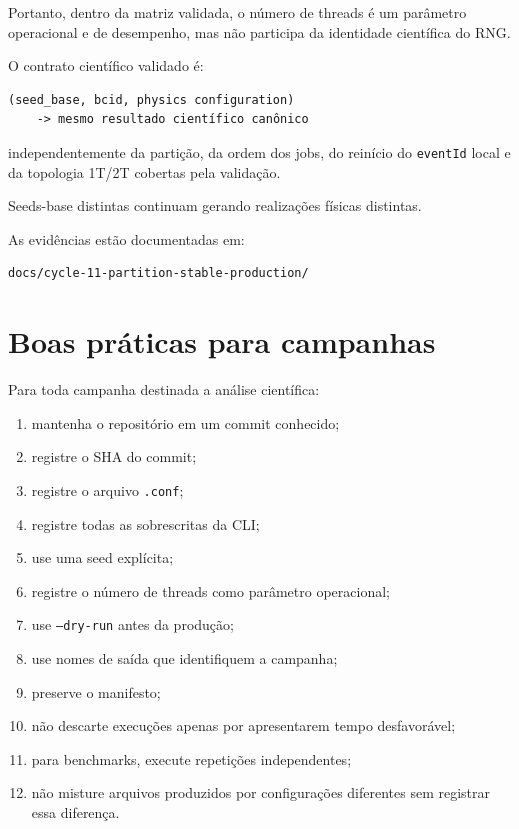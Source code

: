 \documentclass[11pt,a4paper]{article}
\begin{document}
Portanto, dentro da matriz validada, o número de threads é um parâmetro
operacional e de desempenho, mas não participa da identidade científica do RNG.

O contrato científico validado é:

\begin{lstlisting}[style=config]
(seed_base, bcid, physics configuration)
    -> mesmo resultado científico canônico
\end{lstlisting}

independentemente da partição, da ordem dos jobs, do reinício do
\texttt{eventId} local e da topologia 1T/2T cobertas pela validação.

Seeds-base distintas continuam gerando realizações físicas distintas.

As evidências estão documentadas em:

\begin{lstlisting}[style=shell]
docs/cycle-11-partition-stable-production/
\end{lstlisting}

\section{Boas práticas para campanhas}

Para toda campanha destinada a análise científica:

\begin{enumerate}
  \item mantenha o repositório em um commit conhecido;
  \item registre o SHA do commit;
  \item registre o arquivo \texttt{.conf};
  \item registre todas as sobrescritas da CLI;
  \item use uma seed explícita;
  \item registre o número de threads como parâmetro operacional;
  \item use \texttt{--dry-run} antes da produção;
  \item use nomes de saída que identifiquem a campanha;
  \item preserve o manifesto;
  \item não descarte execuções apenas por apresentarem tempo desfavorável;
  \item para benchmarks, execute repetições independentes;
  \item não misture arquivos produzidos por configurações diferentes sem
        registrar essa diferença.
\end{enumerate}
\end{document}
